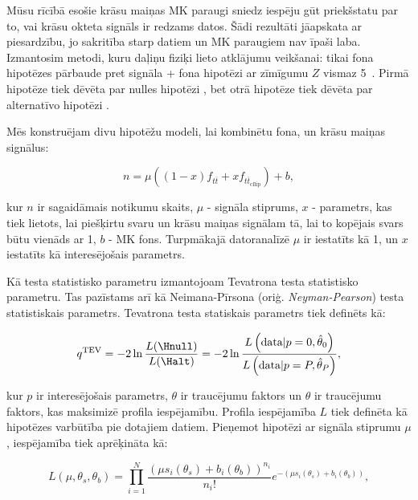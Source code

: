 \label{subsec:hypo_testing}

Mūsu rīcībā esošie krāsu maiņas MK paraugi sniedz iespēju gūt priekšstatu par to, vai krāsu okteta \PW signāls ir redzams datos. Šādi rezultāti jāapskata ar piesardzību, jo sakritība starp datiem un MK paraugiem nav īpaši laba. Izmantosim metodi, kuru daļiņu fiziķi lieto atklājumu veikšanai: tikai fona hipotēzes pārbaude pret signāla + fona hipotēzi ar zīmīgumu $Z$ vismaz 5~\cite{Cowan:2010js}. Pirmā hipotēze tiek dēvēta par nulles hipotēzi \Hnull, bet otrā hipotēze tiek dēvēta par alternatīvo hipotēzi \Halt.

Mēs konstruējam divu hipotēžu modeli, lai kombinētu fona, \ttbar un krāsu maiņas \ttbar signālus:

\begin{equation}
  n=\mu\left(\left(1-x\right)f_{t\overline{t}} + xf_{t\overline{t}_{\text{cflip}}}\right) + b,
  \label{eq:two_hypo_model}
\end{equation}

kur $n$ ir sagaidāmais notikumu skaits, $\mu$ - signāla stiprums, $x$  - parametrs, kas tiek lietots, lai piešķirtu svaru \ttbar un krāsu maiņas \ttbar signālam tā, lai to kopējais svars būtu vienāds ar 1, $b$ - MK fons. Turpmākajā datoranalīzē $\mu$ ir iestatīts kā 1, un $x$ iestatīts kā interesējošais parametrs.

Kā testa statistisko parametru izmantojoam Tevatrona testa statistisko parametru. Tas pazīstams arī kā Neimana-Pīrsona (oriģ. \textit{Neyman-Pearson}) testa statistiskais parametrs. Tevatrona testa statiskais parametrs tiek definēts kā:

\begin{equation}
  q^{\text{TEV}}=-2\ln{\frac{L(\Hnull)}{L(\Halt)}}=-2\ln{\frac{L\left(\text{data}|p=0,\hat{\theta}_{0}\right)}{L\left(\text{data}|p=P,\hat{\theta}_{P}\right)}},
\end{equation}

kur $p$ ir interesējošais parametrs, $\theta$ ir traucējumu faktors un $\hat{\theta}$ ir traucējumu faktors, kas maksimizē profila iespējamību. Profila iespējamība $L$ tiek definēta kā hipotēzes varbūtība pie dotajiem datiem. Pieņemot hipotēzi ar signāla stiprumu $\mu$, iespējamība tiek aprēķināta kā:

\begin{equation}
  L\left(\mu, \theta_{s}, \theta_{b}\right) = \prod_{i=1}^{N}\frac{\left(\mu s_{i}\left(\theta_{s}\right) + b_{i}\left(\theta_{b}\right)\right)^{n_{i}}}{n_{i}!}e^{-\left(\mu s_{i}\left(\theta_{s}\right) + b_{i}\left(\theta_{b}\right)\right)},
\end{equation}

